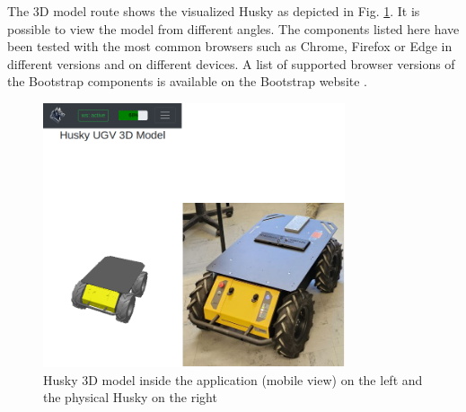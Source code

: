 \documentclass[conference]{IEEEtran}
\begin{document}
The 3D model route shows the visualized Husky as depicted in Fig. \ref{fig:3dreal}. It is possible to view the model from different angles.
The components listed here have been tested with the most common browsers such as Chrome, Firefox or Edge in different versions and on different devices. A list of supported browser versions of the Bootstrap components is available on the Bootstrap website \cite{bsBrowsers}. 
\begin{figure}[htbp]
    \centerline{\includegraphics[width=8.9cm]{Pictures/3dreal.png}}
    \caption{Husky 3D model inside the application (mobile view) on the left and the physical Husky on the right}
    \label{fig:3dreal}
\end{figure}
\end{document}
